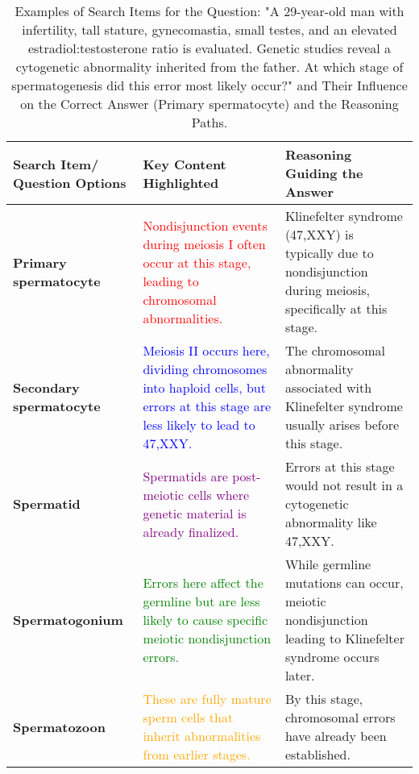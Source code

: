 \begin{table*}[h!]
\centering
\begin{tabular}{|p{3cm}|p{4cm}|p{4cm}|}
\hline
\textbf{Search Item/ Question Options} & \textbf{Key Content Highlighted} & \textbf{Reasoning Guiding the Answer} \\ \hline

\textbf{Primary spermatocyte} &
\textcolor{red}{Nondisjunction events during meiosis I often occur at this stage, leading to chromosomal abnormalities.} &
Klinefelter syndrome (47,XXY) is typically due to nondisjunction during meiosis, specifically at this stage. \\ \hline

\textbf{Secondary spermatocyte} &
\textcolor{blue}{Meiosis II occurs here, dividing chromosomes into haploid cells, but errors at this stage are less likely to lead to 47,XXY.} &
The chromosomal abnormality associated with Klinefelter syndrome usually arises before this stage. \\ \hline

\textbf{Spermatid} &
\textcolor{purple}{Spermatids are post-meiotic cells where genetic material is already finalized.} &
Errors at this stage would not result in a cytogenetic abnormality like 47,XXY. \\ \hline

\textbf{Spermatogonium} &
\textcolor{green}{Errors here affect the germline but are less likely to cause specific meiotic nondisjunction errors.} &
While germline mutations can occur, meiotic nondisjunction leading to Klinefelter syndrome occurs later. \\ \hline

\textbf{Spermatozoon} &
\textcolor{orange}{These are fully mature sperm cells that inherit abnormalities from earlier stages.} &
By this stage, chromosomal errors have already been established. \\ \hline

\end{tabular}
\caption{Examples of Search Items for the Question: "A 29-year-old man with infertility, tall stature, gynecomastia, small testes, and an elevated estradiol:testosterone ratio is evaluated. Genetic studies reveal a cytogenetic abnormality inherited from the father. At which stage of spermatogenesis did this error most likely occur?" and Their Influence on the Correct Answer (Primary spermatocyte) and the Reasoning Paths.}
\label{table:search_guidance_4}
\end{table*}


